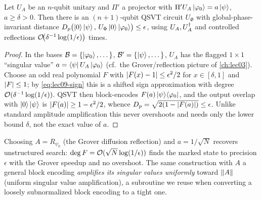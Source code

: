 \begin{proposition}
\label{prop:lec09-fpaa}
Let $U_A$ be an $n$-qubit unitary and $\Pi'$ a projector with
$\Pi'U_A\ket{\varphi_0}=a\ket\psi$, $a\ge\delta>0$. Then there is an $(n+1)$-qubit QSVT
circuit $U_\Phi$ with global-phase-invariant distance
$D_p\bigl(\ket0\ket\psi,\,U_\Phi\ket0\ket{\varphi_0}\bigr)\le\epsilon$, using
$U_A,U_A^{\dagger}$ and controlled reflections $\mathcal{O}\!\bigl(\delta^{-1}\log(1/\epsilon)\bigr)$
times.
\end{proposition}

\begin{proof}
In the bases $\mathcal B=\{\ket{\varphi_0},\dots\}$, $\mathcal B'=\{\ket\psi,\dots\}$,
$U_A$ has the flagged $1\times1$ ``singular value'' $a=\bra\psi U_A\ket{\varphi_0}$
(cf.\ the Grover/reflection picture of \cref{ch:lec03}). Choose an odd real polynomial
$F$ with $\left\lvert F(x)-1 \right\rvert\le\epsilon^2/2$ for $x\in[\delta,1]$ and $\left\lvert F \right\rvert\le1$; by
\eqref{eq:lec09-sign} this is a shifted sign approximation with degree
$\mathcal{O}(\delta^{-1}\log(1/\epsilon))$. QSVT then block-encodes
$F(a)\ket\psi\!\bra{\varphi_0}$, and the output overlap with $\ket0\ket\psi$ is
$\left\lvert F(a) \right\rvert\ge1-\epsilon^2/2$, whence $D_p=\sqrt{2(1-\left\lvert F(a) \right\rvert)}\le\epsilon$. Unlike
standard amplitude amplification this never overshoots and needs only the lower bound
$\delta$, not the exact value of $a$.
\end{proof}

Choosing $A=R_{\psi_0}$ (the Grover diffusion reflection) and $a=1/\sqrt N$ recovers
unstructured search: $\deg F=\mathcal{O}(\sqrt N\log(1/\epsilon))$ finds the marked state to
precision $\epsilon$ with the Grover speedup and no overshoot. The same construction
with $A$ a general block encoding \emph{amplifies its singular values uniformly}
toward $\left\lVert A \right\rVert$ (uniform singular value amplification), a subroutine we reuse when
converting a loosely subnormalized block encoding to a tight one.

